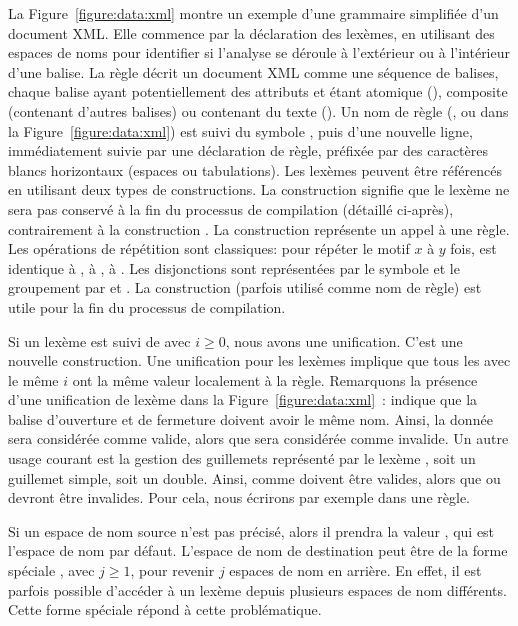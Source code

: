 La Figure~\ref{figure:data:xml} montre un exemple d'une grammaire simplifiée
d'un document XML. Elle commence par la déclaration des lexèmes, en utilisant
des espaces de noms pour identifier si l'analyse se déroule à l'extérieur ou à
l'intérieur d'une balise. La règle  décrit un document XML comme une
séquence de balises, chaque balise ayant potentiellement des attributs et étant
atomique (), composite (contenant d'autres balises) ou contenant
du texte (). Un nom de règle (,
 ou  dans la Figure~\ref{figure:data:xml}) est suivi
du symbole \code{:}, puis d'une nouvelle ligne, immédiatement suivie par une
{\strong déclaration de règle}, préfixée par des caractères blancs horizontaux
(espaces ou tabulations). Les lexèmes peuvent être référencés en utilisant deux
types de constructions. La construction  signifie que le lexème
ne sera pas conservé à la fin du processus de compilation (détaillé ci-après),
contrairement à la construction . La construction 
représente un appel à une règle.  Les opérations de répétition sont classiques:
 pour répéter le motif $x$ à $y$ fois,  est identique
à , \code{+} à , \code{*} à . Les
disjonctions sont représentées par le symbole \code{\mvert} et le groupement par
\code{(} et \code{)}. La construction  (parfois utilisé comme nom
de règle) est utile pour la fin du processus de compilation.

Si un lexème est suivi de \code{[$i$]} avec $i \geq 0$, nous avons une
unification. C'est une nouvelle construction. Une unification pour les lexèmes
implique que tous les  avec le même $i$ ont la même valeur
localement à la règle.  Remarquons la présence d'une unification de lexème dans
la Figure~\ref{figure:data:xml}~:  indique que la balise
d'ouverture et de fermeture doivent avoir le même nom. Ainsi, la donnée
 sera considérée comme valide, alors que 
sera considérée comme invalide. Un autre usage courant est la gestion des
guillemets représenté par le lexème , soit un guillemet simple, soit
un double. Ainsi,  comme  doivent être valides, alors que
 ou  devront être invalides. Pour cela, nous écrirons par
exemple  dans une règle.

Si un espace de nom source n'est pas précisé, alors il prendra la valeur
, qui est l'espace de nom par défaut. L'espace de nom de
destination peut être de la forme spéciale , avec $j
\geq 1$, pour revenir $j$ espaces de nom en arrière. En effet, il est parfois
possible d'accéder à un lexème depuis plusieurs espaces de nom différents. Cette
forme spéciale répond à cette problématique. \\

